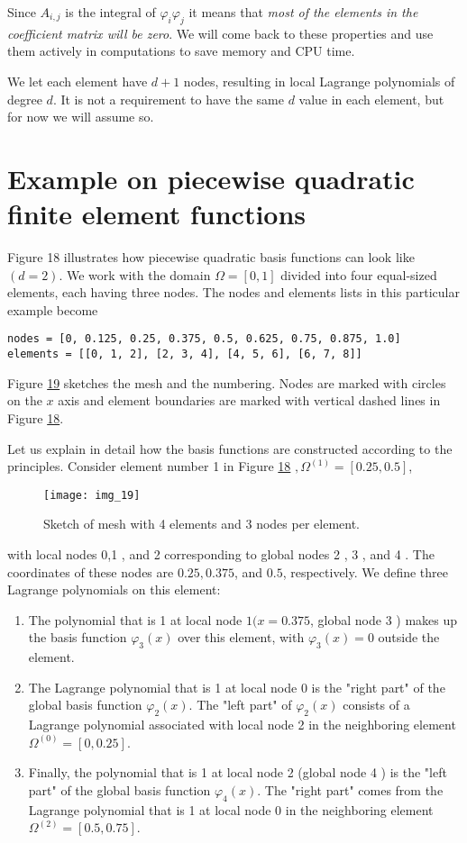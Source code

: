 \documentclass[../main.tex]{subfiles}
\begin{document}
\noindent Since $A_{i, j}$ is the integral of $\varphi_{i} \varphi_{j}$ it means that \textit{most of the elements in the coefficient matrix will be zero}. We will come back to these properties and use them actively in computations to save memory and CPU time.

We let each element have $d+1$ nodes, resulting in local Lagrange polynomials of degree $d$. It is not a requirement to have the same $d$ value in each element, but for now we will assume so.
\section[Example on piecewise quadratic finite element functions]{Example on piecewise quadratic finite element functions}
\label{sec:sec_3_3}
\noindent Figure 18 illustrates how piecewise quadratic basis functions can look like $(d=2)$. We work with the domain $\Omega=[0,1]$ divided into four equal-sized elements, each having three nodes. The nodes and elements lists in this particular example become
\begin{lstlisting}[numbers=none]
nodes = [0, 0.125, 0.25, 0.375, 0.5, 0.625, 0.75, 0.875, 1.0]
elements = [[0, 1, 2], [2, 3, 4], [4, 5, 6], [6, 7, 8]]	
\end{lstlisting}
Figure \hyperref[fig:img_19]{19} sketches the mesh and the numbering. Nodes are marked with circles on the $x$ axis and element boundaries are marked with vertical dashed lines in Figure \hyperref[fig:img_18]{18}.

Let us explain in detail how the basis functions are constructed according to the principles. Consider element number 1 in Figure \hyperref[fig:img_18]{18} $, \Omega^{(1)}=[0.25,0.5]$,
\begin{figure}[H]
	\centering
	\texttt{[image: img\_19]}
	\caption{Sketch of mesh with 4 elements and 3 nodes per element.}
	\label{fig:img_19}
\end{figure}
\noindent with local nodes 0,1 , and 2 corresponding to global nodes 2 , 3 , and 4 . The coordinates of these nodes are $0.25,0.375$, and $0.5$, respectively. We define three Lagrange polynomials on this element:
\begin{enumerate}
	\item The polynomial that is 1 at local node $1(x=0.375$, global node 3 ) makes up the basis function $\varphi_{3}(x)$ over this element, with $\varphi_{3}(x)=0$ outside the element.
	\item The Lagrange polynomial that is 1 at local node 0 is the "right part" of the global basis function $\varphi_{2}(x)$. The "left part" of $\varphi_{2}(x)$ consists of a Lagrange polynomial associated with local node 2 in the neighboring element $\Omega^{(0)}=[0,0.25]$.
	\item Finally, the polynomial that is 1 at local node 2 (global node 4 ) is the "left part" of the global basis function $\varphi_{4}(x)$. The "right part" comes from the Lagrange polynomial that is 1 at local node 0 in the neighboring element $\Omega^{(2)}=[0.5,0.75]$.
\end{enumerate}	
\end{document}
